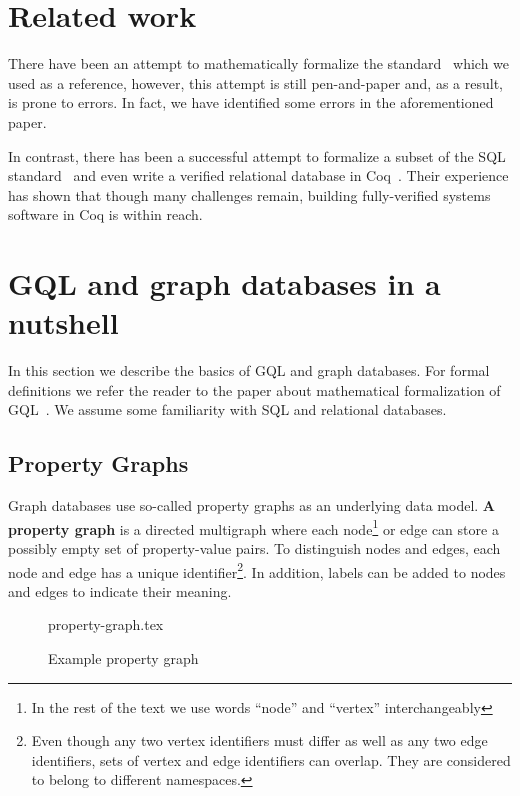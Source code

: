 \documentclass[14pt]{constructor-thesis}
\theoremstyle{definition}
\begin{document}
\section{Related work}

There have been an attempt to mathematically formalize the standard~\cite{GQL-formalized-on-paper} which we used as a reference, however, this attempt is still pen-and-paper and, as a result, is prone to errors. In fact, we have identified some errors in the aforementioned paper.


In contrast, there has been a successful attempt to formalize a subset of the SQL standard~\cite{sql-in-coq} and even write a verified relational database in Coq~\cite{rdbms-in-coq}. Their experience has shown that though many challenges remain, building fully-verified systems software in Coq is within reach.

\section{GQL and graph databases in a nutshell}

In this section we describe the basics of GQL and graph databases. For formal definitions we refer the reader to the paper about mathematical formalization of GQL~\cite{GQL-formalized-on-paper}. We assume some familiarity with SQL and relational databases.

\subsection{Property Graphs}
\label{section:intro-property-graphs}

Graph databases use so-called property graphs as an underlying data model. \textbf{A property graph} is a directed multigraph where each node\footnote{In the rest of the text we use words ``node'' and ``vertex'' interchangeably} or edge can store a possibly empty set of property-value pairs. To distinguish nodes and edges, each node and edge has a unique identifier\footnote{Even though any two vertex identifiers must differ as well as any two edge identifiers, sets of vertex and edge identifiers can overlap. They are considered to belong to different namespaces.}. In addition, labels can be added to nodes and edges to indicate their meaning.

\begin{figure}[b]
  \centering
  
  {property-graph.tex}

  \caption{Example property graph}
  \label{fig:property-graph}
\end{figure}
\end{document}
